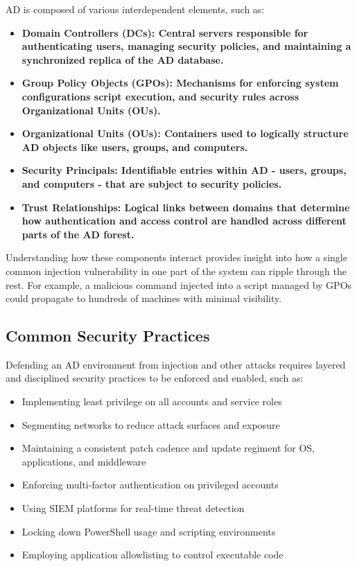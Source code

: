 AD is composed of various interdependent elements, such as:

\begin{itemize}
    \item \textbf{\textbf{Domain Controllers (DCs): }Central servers responsible for authenticating users, managing security policies, and maintaining a synchronized replica of the AD database.}
    \item \textbf{\textbf{Group Policy Objects (GPOs): }Mechanisms for enforcing system configurations script execution, and security rules across Organizational Units (OUs).}
    \item \textbf{\textbf{Organizational Units (OUs): }Containers used to logically structure AD objects like users, groups, and computers.}
    \item \textbf{\textbf{Security Principals: }Identifiable entries within AD - users, groups, and computers - that are subject to security policies.}
    \item \textbf{\textbf{Trust Relationships: }Logical links between domains that determine how authentication and access control are handled across different parts of the AD forest.}
\end{itemize}

Understanding how these components interact provides insight into how a single common injection vulnerability in one part of the system can ripple through the rest. For example, a malicious command injected into a script managed by GPOs could propagate to hundreds of machines with minimal visibility.

\subsection{Common Security Practices}

Defending an AD environment from injection and other attacks requires layered and disciplined security practices to be enforced and enabled, such as:

\begin{itemize}
    \item Implementing least privilege on all accounts and service roles
    \item Segmenting networks to reduce attack surfaces and exposure
    \item Maintaining a consistent patch cadence and update regiment for OS, applications, and middleware
    \item Enforcing multi-factor authentication on privileged accounts
    \item Using SIEM platforms for real-time threat detection
    \item Locking down PowerShell usage and scripting environments
    \item Employing application allowlisting to control executable code
\end{itemize}

